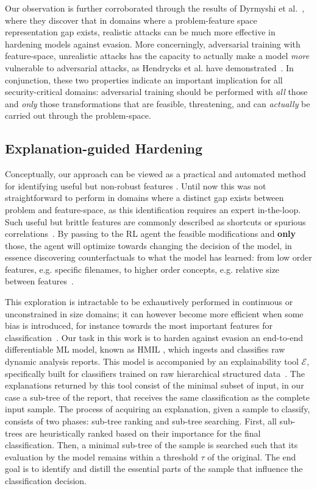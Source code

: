 Our observation is further corroborated through the results of Dyrmyshi et al.~\cite{dyrmishi2023empirical}, where they discover that in domains where a problem-feature space representation gap exists, realistic attacks can be much more effective in hardening models against evasion.
More concerningly, adversarial training with feature-space, unrealistic attacks has the capacity to actually make a model \textit{more} vulnerable to adversarial attacks, as Hendrycks et al. have demonstrated~\cite{hendrycks2019benchmarking}.
In conjunction, these two properties indicate an important implication for all security-critical domains: adversarial training should be performed with \textit{all} those and \textit{only} those transformations that are feasible, threatening, and can \textit{actually} be carried out through the problem-space.

\subsection{Explanation-guided Hardening}
\label{sec:explainer}
Conceptually, our approach can be viewed as a practical and automated method for identifying useful but non-robust features \cite{ilyas2019adversarial}.
Until now this was not straightforward to perform in domains where a distinct gap exists between problem and feature-space, as this identification requires an expert in-the-loop.
Such useful but brittle features are commonly described as shortcuts or spurious correlations~\cite{geirhos2020shortcut}.
By passing to the RL agent the feasible modifications and \textbf{only} those, the agent will optimize towards changing the decision of the model, in essence discovering counterfactuals to what the model has learned: from low order features, e.g. specific filenames, to higher order concepts, e.g. relative size between features~\cite{kim2018interpretability}.

This exploration is intractable to be exhaustively performed in continuous or unconstrained in size domains; it can however become more efficient when some bias is introduced, for instance towards the most important features for classification~\cite{casper2022robust}.
Our task in this work is to harden against evasion an end-to-end differentiable ML model, known as \gls{HMIL} \cite{pevny2017using}, which ingests and classifies raw dynamic analysis reports.
This model is accompanied by an explainability tool $\mathcal{E}$, specifically built for classifiers trained on raw hierarchical structured data~\cite{pevny2022explaining}.
The explanations returned by this tool consist of the minimal subset of input, in our case a sub-tree of the report, that receives the same classification as the complete input sample.
The process of acquiring an explanation, given a sample to classify, consists of two phases: sub-tree ranking and sub-tree searching.
First, all sub-trees are heuristically ranked based on their importance for the final classification.
Then, a minimal sub-tree of the sample is searched such that its evaluation by the model remains within a threshold $\tau$ of the original.
The end goal is to identify and distill the essential parts of the sample that influence the classification decision.


